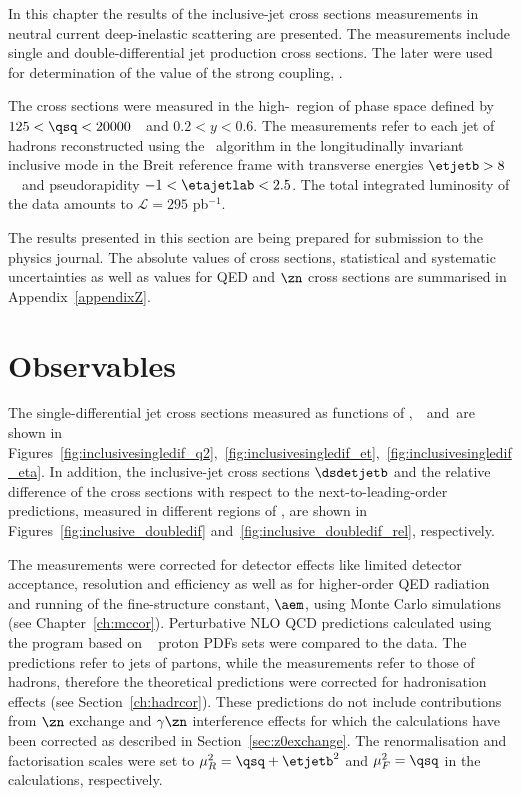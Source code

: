 In this chapter the results of the inclusive-jet cross sections measurements in neutral current deep-inelastic scattering are presented. The measurements include single and double-differential jet production cross sections. The later were used for determination of the value of the strong coupling, \asz. 

The cross sections were measured in the high-\qsq~region of phase space defined by $125 < \qsq < 20000$~\GeV~and $0.2<y<0.6$. The measurements refer to each jet of hadrons reconstructed using the \kt\, algorithm in the longitudinally invariant inclusive mode in the Breit reference frame with transverse energies $\etjetb > 8$~\GeV~and pseudorapidity $-1<\etajetlab<2.5$. The total integrated luminosity of the data amounts to $\mathcal{L}=295$ pb$^{-1}$.

The results presented in this section are being prepared for submission to the physics journal. The absolute values of cross sections, statistical and systematic uncertainties as well as values for QED and $\zn$ cross sections are summarised in Appendix~\ref{appendixZ}.

\section{Observables}
The single-differential jet cross sections measured as functions of \qsq,~\etjetb~and~\etajetlab are shown in Figures~\ref{fig:inclusivesingledif_q2},~\ref{fig:inclusivesingledif_et},~\ref{fig:inclusivesingledif_eta}. In addition, the inclusive-jet cross sections $\dsdetjetb$ and the relative difference of the cross sections with respect to the next-to-leading-order predictions, measured in different regions of \qsq, are shown in Figures~\ref{fig:inclusive_doubledif} and~\ref{fig:inclusive_doubledif_rel}, respectively.

The measurements were corrected for detector effects like limited detector acceptance, resolution and efficiency as well as for higher-order QED radiation and running of the fine-structure constant, $\aem$, using Monte Carlo simulations (see Chapter~\ref{ch:mccor}). Perturbative NLO QCD predictions calculated using the \nlojet program based on ~\cite{upub:herapdf1.5} proton PDFs sets were compared to the data. The \nlojet predictions refer to jets of partons, while the measurements refer to those of hadrons, therefore the theoretical predictions were corrected for hadronisation effects (see Section~\ref{ch:hadrcor}). These predictions do not include contributions from $\zn$ exchange and $\gamma\zn$ interference effects for which the calculations have been corrected as described in Section~\ref{sec:z0exchange}. The renormalisation and factorisation scales were set to $\mu_R^2 = \qsq + \etjetb^2$ and $\mu_F^2 = \qsq$ in the calculations, respectively.

